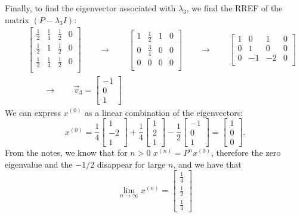Finally, to find the eigenvector associated with $\lambda_3$, we find the RREF of the matrix $(P-\lambda_3 I)$:
\begin{eqnarray*}
  &&\left[\begin{array}{ccc|c}
	\frac{1}{2}&\frac{1}{4}&\frac{1}{2}&0\\\frac{1}{2}&1&\frac{1}{2}&0\\\frac{1}{2}&\frac{1}{4}&\frac{1}{2}&0\\
        \end{array}\right]\qquad\rightarrow\qquad
	\left[\begin{array}{ccc|c}
	1&\frac{1}{2}&1&0\\0&\frac{3}{4}&0&0\\0&0&0&0\\
        \end{array}\right]\qquad\rightarrow\qquad
	\left[\begin{array}{ccc|c}
	1&0&1&0\\0&1&0&0\\0&-1&-2&0\\
        \end{array}\right]\\
	&&\qquad\rightarrow\qquad\vec{v}_3=\left[\begin{array}{c}-1\\0\\1\end{array}\right]
\end{eqnarray*}
We can express $x^{(0)}$ as a linear combination of the eigenvectors:
$$
x^{(0)}=\frac{1}{4}\left[\begin{array}{c}1\\-2\\1\end{array}\right]
+\frac{1}{4}\left[\begin{array}{c}1\\2\\1\end{array}\right]
-\frac{1}{2}\left[\begin{array}{c}-1\\0\\1\end{array}\right] =
\left[\begin{array}{c}1\\0\\0\end{array}\right].
$$
From the notes, we know that for $n>0$ $x^{(n)}=P^nx^{(0)}$, therefore the zero eigenvalue and the $-1/2$ disappear for large $n$, and we have that
$$
\lim_{n\rightarrow\infty}x^{(n)}=
\left[\begin{array}{c}\frac{1}{4}\\\frac{1}{2}\\\frac{1}{4}\end{array}\right]
$$

